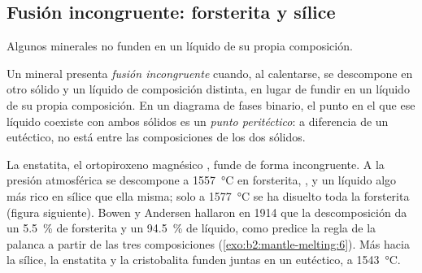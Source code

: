 \subsection*{Fusión incongruente: forsterita y sílice}

Algunos minerales no funden en un líquido de su propia composición.

\begin{definition}\label{def:b2:mantle-melting:peritectic}
Un mineral presenta \emph{fusión incongruente} cuando, al
calentarse, se descompone en otro sólido y un líquido de composición
distinta, en lugar de fundir en un líquido de su propia composición. En un diagrama de fases
binario, el punto en el que ese líquido coexiste con ambos sólidos es un
\emph{punto peritéctico}: a diferencia de un eutéctico, no está
entre las composiciones de los dos sólidos.
\end{definition}

La enstatita, el ortopiroxeno magnésico , funde de forma incongruente. A
la presión atmosférica se descompone a \qty{1557}{\celsius} en forsterita,
, y un líquido algo más rico en sílice que ella misma; solo a
\qty{1577}{\celsius} se ha disuelto toda la forsterita (figura siguiente). Bowen
y Andersen hallaron en 1914 que la descomposición da un \qty{5.5}{\percent} de
forsterita y un \qty{94.5}{\percent} de líquido, como predice la regla de la palanca a partir de
las tres composiciones (\cref{exo:b2:mantle-melting:6}). Más hacia la sílice, la enstatita y la
cristobalita funden juntas en un eutéctico, a \qty{1543}{\celsius}.

